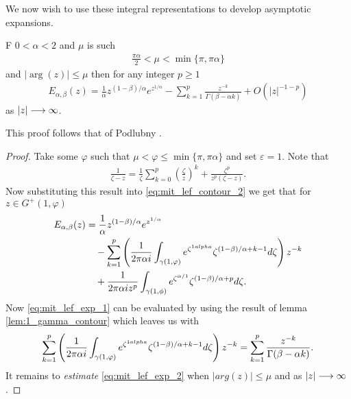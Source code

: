 We now wish to use these integral representations to develop asymptotic expansions.
\begin{lemma}
    F $ 0 < \alpha < 2 $ and $ \mu $ is such
    \begin{align}
        \frac{\pi \alpha}{2} < \mu < \min\{\pi, \pi\alpha \}
    \end{align}
    and $ | \arg(z) | \leq \mu $
    then for any integer $ p \geq 1 $    
    \begin{align}
        E_{\alpha, \beta}(z) = \frac{1}{\alpha} z^{(1 - \beta) / \alpha} e^{z^{1/\alpha}} - \sum_{k=1}^p \frac{z^{-k}}{\Gamma(\beta - \alpha k)} + O(|z|^{-1-p})
    \end{align}
    as $ |z| \longrightarrow \infty $.
\end{lemma}
This proof follows that of Podlubny \cite{Podlubny1999}.
\begin{proof}
    Take some $ \varphi $ such that $ \mu < \varphi \leq \min\{\pi,\pi\alpha\} $ and set
    $ \varepsilon  = 1 $.
    Note that 
    \begin{align}
        \label{eq:geometric_expansion}
        \frac{1}{\zeta - z} = \frac{1}{\zeta}\sum_{k=0}^p \left( \frac{\zeta}{z}\right)^k + \frac{\zeta^p}{z^p(\zeta - z)}.
    \end{align}
    Now substituting this result into \eqref{eq:mit_lef_contour_2}
    we get that for $ z \in G^+(1, \varphi) $
    \begin{align}
        E_{\alpha, \beta}(z) &= \frac{1}{\alpha} z^{(1-\beta)/\alpha} e^{z^{1 / \alpha}} \\
        \label{eq:mit_lef_exp_1}    
        & \ \ \ - \sum_{k=1}^p \left( \frac{1}{2\pi\alpha i} \int_{\gamma(1,\varphi)} e^{\zeta^{1\/alpha}} \zeta^{(1-\beta)/\alpha + k - 1} d\zeta \right) z^{-k}  \\ 
        \label{eq:mit_lef_exp_2}
            & \ \ \ + \frac{1}{2\pi\alpha i z^p} \int_{\gamma(1,\phi)} e^{\zeta^{\alpha / 1}} \zeta^{(1-\beta)/\alpha + p} d\zeta.
    \end{align}
    Now \eqref{eq:mit_lef_exp_1} can be evaluated by using the result of lemma \ref{lem:1_gamma_contour} which leaves us with 
    \begin{align}
        \label{eq:mit_lef_asym_sum_1}
        \sum_{k=1}^p \left( \frac{1}{2\pi\alpha i} \int_{\gamma(1,\varphi)} e^{\zeta^{1\/alpha}} \zeta^{(1-\beta)/\alpha + k - 1} d\zeta \right) z^{-k} = \sum_{k=1}^p \frac{z^{-k}}{\Gamma(\beta - \alpha k)}.
    \end{align}
    It remains to \emph{estimate} \eqref{eq:mit_lef_exp_2} when $ |arg(z)| \leq \mu $ and as $ |z| \longrightarrow \infty $. 
    

\end{proof}
